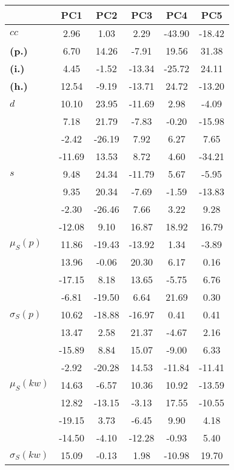 \begin{table}[h!]
\begin{center}
\begin{tabular}{| l || c | c | c | c | c |}\hline
 & {\bf PC1} & {\bf PC2} & {\bf PC3} & {\bf PC4} & {\bf PC5} \\\hline\hline
{\bf $cc$} & 2.96 & 1.03 & 2.29 & -43.90 & -18.42 \\
{\bf (p.)} & 6.70 & 14.26 & -7.91 & 19.56 & 31.38 \\
{\bf (i.)} & 4.45 & -1.52 & -13.34 & -25.72 & 24.11 \\
{\bf (h.)} & 12.54 & -9.19 & -13.71 & 24.72 & -13.20 \\\hline
{\bf $d$} & 10.10 & 23.95 & -11.69 & 2.98 & -4.09 \\
{\bf } & 7.18 & 21.79 & -7.83 & -0.20 & -15.98 \\
{\bf } & -2.42 & -26.19 & 7.92 & 6.27 & 7.65 \\
{\bf } & -11.69 & 13.53 & 8.72 & 4.60 & -34.21 \\\hline
{\bf $s$} & 9.48 & 24.34 & -11.79 & 5.67 & -5.95 \\
{\bf } & 9.35 & 20.34 & -7.69 & -1.59 & -13.83 \\
 & -2.30  & -26.46  & 7.66  & 3.22  & 9.28 \\
 & -12.08  & 9.10  & 16.87  & 18.92  & 16.79 \\\hline
$\mu_S(p)$ & 11.86  & -19.43  & -13.92  & 1.34  & -3.89 \\
 & 13.96  & -0.06  & 20.30  & 6.17  & 0.16 \\
 & -17.15  & 8.18  & 13.65  & -5.75  & 6.76 \\
 & -6.81  & -19.50  & 6.64  & 21.69  & 0.30 \\\hline
$\sigma_S(p)$ & 10.62  & -18.88  & -16.97  & 0.41  & 0.41 \\
 & 13.47  & 2.58  & 21.37  & -4.67  & 2.16 \\
 & -15.89  & 8.84  & 15.07  & -9.00  & 6.33 \\
 & -2.92  & -20.28  & 14.53  & -11.84  & -11.41 \\\hline
$\mu_S(kw)$ & 14.63  & -6.57  & 10.36  & 10.92  & -13.59 \\
 & 12.82  & -13.15  & -3.13  & 17.55  & -10.55 \\
 & -19.15  & 3.73  & -6.45  & 9.90  & 4.18 \\
 & -14.50  & -4.10  & -12.28  & -0.93  & 5.40 \\\hline
$\sigma_S(kw)$ & 15.09  & -0.13  & 1.98  & -10.98  & 19.70 \\

\end{tabular}
\end{center}
\end{table}
